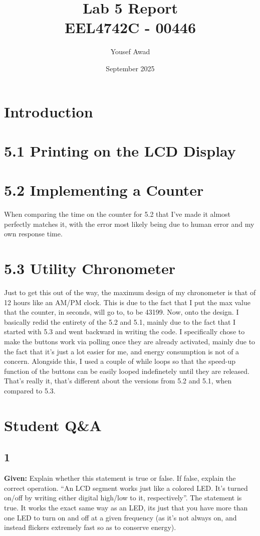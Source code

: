 \documentclass{article}
\title{Lab 5 Report \\ \large EEL4742C - 00446}
\author{Yousef Awad}
\date{September 2025}
\begin{document}
\maketitle
\tableofcontents
\newpage

\section{Introduction}

\section{5.1 Printing on the LCD Display}


\section{5.2 Implementing a Counter}
When comparing the time on the counter for 5.2 that I've made it almost perfectly matches it, with the error most likely being due to human error and my own response time.


\section{5.3 Utility Chronometer}
Just to get this out of the way, the maximum design of my chronometer is that of 12 hours like an AM/PM clock. This is due to the fact that I put the max value that the counter, in seconds, will go to, to be 43199. Now, onto the design. I basically redid the entirety of the 5.2 and 5.1, mainly due to the fact that I started with 5.3 and went backward in writing the code. I specifically chose to make the buttons work via polling once they are already activated, mainly due to the fact that it's just a lot easier for me, and energy consumption is not of a concern. Alongside this, I used a couple of while loops so that the speed-up function of the buttons can be easily looped indefinetely until they are released. That's really it, that's different about the versions from 5.2 and 5.1, when compared to 5.3.


\section{Student Q\&A}
\subsection{1}
\textbf{Given:} Explain whether this statement is true or false. If false, explain the correct operation. “An LCD segment works just like a colored LED. It’s turned on/off by writing either digital high/low to it, respectively”.
\newline
\newline
The statement is true. It works the exact same way as an LED, its just that you have more than one LED to turn on and off at a given frequency (as it's not always on, and instead flickers extremely fast so as to conserve energy).
\end{document}
